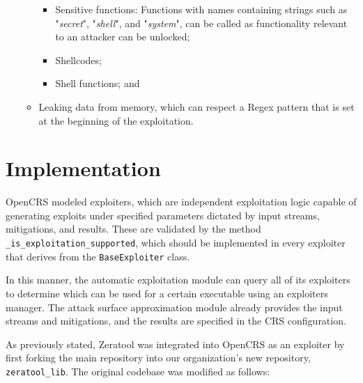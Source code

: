 \documentclass[../main.tex]{subfiles}
\begin{document}
\begin{enumerate}
\begin{itemize}
                        \begin{itemize}
                              \tightlist
                              \item
                                    Sensitive functions: Functions with names containing strings such
                                    as "\emph{secret}", "\emph{shell}", and "\emph{system}", can
                                    be called as functionality relevant to an attacker can be
                                    unlocked;
                              \item
                                    Shellcodes;
                              \item
                                    Shell functions; and
                        \end{itemize}
                  \item
                        Leaking data from memory, which can respect a Regex pattern that is
                        set at the beginning of the exploitation.
            \end{itemize}
\end{enumerate}

\hypertarget{implementation}{%
      \section{Implementation}\label{implementation}}

OpenCRS modeled exploiters, which are independent exploitation logic capable of
generating exploits under specified parameters dictated by input streams,
mitigations, and results. These are validated by the method
\texttt{\_is\_exploitation\_supported}, which should be implemented in every
exploiter that derives from the \texttt{BaseExploiter} class.

In this manner, the automatic exploitation module can query all of its
exploiters to determine which can be used for a certain executable using an
exploiters manager. The attack surface approximation module already provides
the input streams and mitigations, and the results are specified in the CRS
configuration.

As previously stated, Zeratool was integrated into OpenCRS as an exploiter by
first forking the main repository \cite{zeratool_lib} into our organization's
new repository, \texttt{zeratool\_lib}. The original codebase was modified as
follows:
\end{document}

